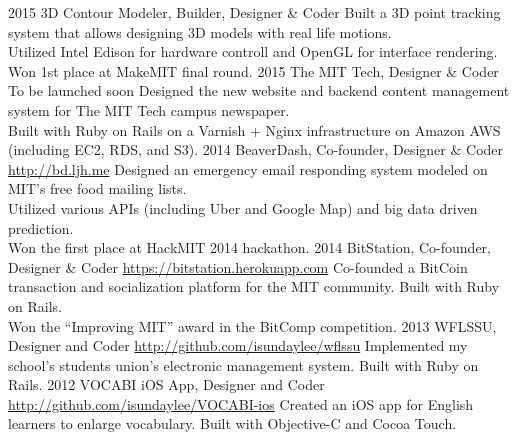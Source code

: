 \documentclass[]{friggeri-cv} %
\begin{document}
\begin{entrylist}
  \entry
  {2015}
  {3D Contour Modeler, Builder, Designer \& Coder}
  {}
  {Built a 3D point tracking system that allows designing 3D models with real life motions. \\
  Utilized Intel Edison for hardware controll and OpenGL for interface rendering. \\
  Won 1st place at MakeMIT final round. }
  \entry
  {2015}
  {The MIT Tech, Designer \& Coder}
  {To be launched soon}
  {Designed the new website and backend content management system for The MIT Tech campus newspaper. \\
  Built with Ruby on Rails on a Varnish + Nginx infrastructure on Amazon AWS (including EC2, RDS, and S3). }
  \entry
  {2014}
  {BeaverDash, Co-founder, Designer \& Coder}
  {\href{http://bd.ljh.me}{http://bd.ljh.me}}
  {Designed an emergency email responding system modeled on MIT's free food mailing lists. \\
  Utilized various APIs (including Uber and Google Map) and big data driven prediction. \\
  Won the first place at HackMIT 2014 hackathon. }
  \entry
  {2014}
  {BitStation, Co-founder, Designer \& Coder}
  {\href{https://bitstation.herokuapp.com}{https://bitstation.herokuapp.com}}
  {Co-founded a BitCoin transaction and socialization platform for the MIT community. Built with Ruby on Rails. \\
  Won the ``Improving MIT'' award in the BitComp competition. }
  \entry
  {2013}
  {WFLSSU, Designer and Coder}
  {\href{http://github.com/isundaylee/wflssu}{http://github.com/isundaylee/wflssu}}
  {Implemented my school's students union's electronic management system. Built with Ruby on Rails.}
  \entry
  {2012}
  {VOCABI iOS App, Designer and Coder}
  {\href{http://github.com/isundaylee/VOCABI-ios}{http://github.com/isundaylee/VOCABI-ios}}
  {Created an iOS app for English learners to enlarge vocabulary. Built with Objective-C and Cocoa Touch.}
\end{entrylist}
\end{document}

